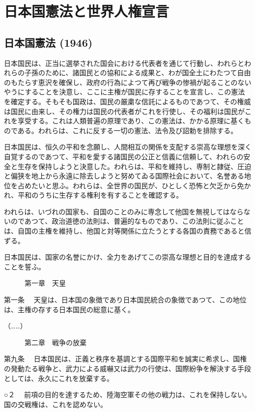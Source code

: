 
\chapter{日本国憲法と世界人権宣言}


\section{日本国憲法 (1946)}

日本国民は、正当に選挙された国会における代表者を通じて行動し、われらとわれらの子孫のために、諸国民との協和による成果と、わが国全土にわたつて自由のもたらす恵沢を確保し、政府の行為によつて再び戦争の惨禍が起ることのないやうにすることを決意し、ここに主権が国民に存することを宣言し、この憲法を確定する。そもそも国政は、国民の厳粛な信託によるものであつて、その権威は国民に由来し、その権力は国民の代表者がこれを行使し、その福利は国民がこれを享受する。これは人類普遍の原理であり、この憲法は、かかる原理に基くものである。われらは、これに反する一切の憲法、法令及び詔勅を排除する。

日本国民は、恒久の平和を念願し、人間相互の関係を支配する崇高な理想を深く自覚するのであつて、平和を愛する諸国民の公正と信義に信頼して、われらの安全と生存を保持しようと決意した。われらは、平和を維持し、専制と隷従、圧迫と偏狭を地上から永遠に除去しようと努めてゐる国際社会において、名誉ある地位を占めたいと思ふ。われらは、全世界の国民が、ひとしく恐怖と欠乏から免かれ、平和のうちに生存する権利を有することを確認する。

われらは、いづれの国家も、自国のことのみに専念して他国を無視してはならないのであつて、政治道徳の法則は、普遍的なものであり、この法則に従ふことは、自国の主権を維持し、他国と対等関係に立たうとする各国の責務であると信ずる。

日本国民は、国家の名誉にかけ、全力をあげてこの崇高な理想と目的を達成することを誓ふ。


　　　第一章　天皇

第一条 　天皇は、日本国の象徴であり日本国民統合の象徴であつて、この地位は、主権の存する日本国民の総意に基く。

（……）

　　　第二章　戦争の放棄

第九条 　日本国民は、正義と秩序を基調とする国際平和を誠実に希求し、国権の発動たる戦争と、武力による威嚇又は武力の行使は、国際紛争を解決する手段としては、永久にこれを放棄する。

○２ 　前項の目的を達するため、陸海空軍その他の戦力は、これを保持しない。国の交戦権は、これを認めない。



